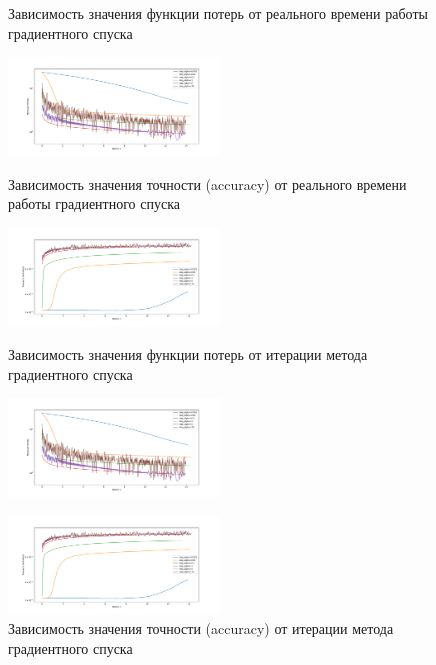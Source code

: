\documentclass[a4paper, 11pt]{article}
\begin{document}
                 \begin{figure}[H] \label{exp1}
                     \begin{multicols}{2}
                         \begin{center}
                             \caption{Зависимость значения функции потерь от реального времени работы градиентного спуска} \label{exp1:gd_func_time}
                             \includegraphics[width=0.5\textwidth, height=0.25\textheight]{../graphs/exp1_func_GD_alpha_time_beta=0,001.pdf}
                             
                             \caption{Зависимость значения точности (accuracy) от реального времени работы градиентного спуска} \label{exp1:gd_acc_time}
                             \includegraphics[width=0.5\textwidth, height=0.25\textheight]{../graphs/exp1_accuracy_GD_alpha_time_beta=0,001.pdf}
                             
                             \caption{Зависимость значения функции потерь от итерации метода градиентного спуска} \label{exp1:gd_func_iter}
                             \includegraphics[width=0.5\textwidth, height=0.25\textheight]{../graphs/exp1_func_GD_alpha_time_beta=0,001.pdf}
                             
                             \caption{Зависимость значения точности (accuracy) от итерации метода градиентного спуска} \label{exp1:gd_acc_iter}
                             \includegraphics[width=0.5\textwidth, height=0.25\textheight]{../graphs/exp1_accuracy_GD_alpha_time_beta=0,001.pdf}
                         \end{center}
                     \end{multicols}
                 \end{figure}
\end{document}
